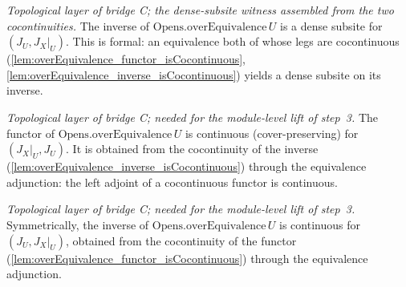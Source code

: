\begin{lemma}\leanok
  \label{lem:overEquivalence_inverse_isDenseSubsite}
  \textit{Topological layer of bridge C; the dense-subsite witness assembled from the two
  cocontinuities.}
  The inverse of \(\mathrm{Opens.overEquivalence}\,U\) is a dense subsite for \((J_U, J_X|_U)\).
  This is formal: an equivalence both of whose legs are cocontinuous
  (\cref{lem:overEquivalence_functor_isCocontinuous},
  \cref{lem:overEquivalence_inverse_isCocontinuous}) yields a dense subsite on its inverse.
\end{lemma}

\begin{lemma}\leanok
  \label{lem:overEquivalence_functor_isContinuous}
  \textit{Topological layer of bridge C; needed for the module-level lift of step~3.}
  The functor of \(\mathrm{Opens.overEquivalence}\,U\) is continuous (cover-preserving) for
  \((J_X|_U, J_U)\). It is obtained from the cocontinuity of the inverse
  (\cref{lem:overEquivalence_inverse_isCocontinuous}) through the equivalence adjunction: the
  left adjoint of a cocontinuous functor is continuous.
\end{lemma}

\begin{lemma}\leanok
  \label{lem:overEquivalence_inverse_isContinuous}
  \textit{Topological layer of bridge C; needed for the module-level lift of step~3.}
  Symmetrically, the inverse of \(\mathrm{Opens.overEquivalence}\,U\) is continuous for
  \((J_U, J_X|_U)\), obtained from the cocontinuity of the functor
  (\cref{lem:overEquivalence_functor_isCocontinuous}) through the equivalence adjunction.
\end{lemma}

